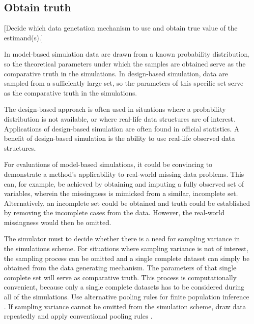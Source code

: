 \documentclass[bimj,fleqn]{w-art}
\theoremstyle{plain}
\theoremstyle{definition}
\begin{document}

\subsection{Obtain truth}


[Decide which data genetation mechanism to use and obtain true value of the estimand(s).] 

In model-based simulation data are drawn from a known probability distribution, so the theoretical parameters under which the samples are obtained serve as the comparative truth in the simulations. In design-based simulation, data are sampled from a sufficiently large set, so the parameters of this specific set serve as the comparative truth in the simulations. 

The design-based approach is often used in situations where a probability distribution is not available, or where real-life data structures are of interest. Applications of design-based simulation are often found in official statistics. A benefit of design-based simulation is the ability to use real-life observed data structures.

For evaluations of model-based simulations, it could be convincing to demonstrate a method's applicability to real-world missing data problems. This can, for example, be achieved by obtaining and imputing a fully observed set of variables, wherein the missingness is mimicked from a similar, incomplete set. Alternatively, an incomplete set could be obtained and truth could be established by removing the incomplete cases from the data. However, the real-world missingness would then be omitted.

The simulator must to decide whether there is a need for sampling variance in the simulations scheme. For situations where sampling variance is not of interest, the sampling process can be omitted and a single complete dataset can simply be obtained from the data generating mechanism. The parameters of that single complete set will serve as comparative truth. This process is computationally convenient, because only a single complete datasets has to be considered during all of the simulations. Use alternative pooling rules for finite population inference \citep{raghunathan2003multiple,vink14}. If sampling variance cannot be omitted from the simulation scheme, draw data repeatedly and apply conventional pooling rules \citep[cf.][p. 76-77]{rubi87}.
\end{document}
